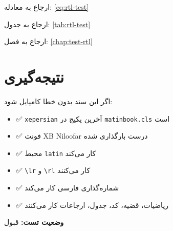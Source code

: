 \documentclass{matinbook}
\begin{document}
ارجاع به معادله: \cref{eq:rtl-test}

ارجاع به جدول: \cref{tab:rtl-test}

ارجاع به فصل: \cref{chap:test-rtl}

\section{نتیجه‌گیری}
\label{sec:conclusion}

اگر این سند بدون خطا کامپایل شود:

\begin{itemize}
    \item ✅ \texttt{xepersian} آخرین پکیج در \texttt{matinbook.cls} است
    \item ✅ فونت XB Niloofar درست بارگذاری شده
    \item ✅ محیط \texttt{latin} کار می‌کند
    \item ✅ \texttt{\textbackslash lr} و \texttt{\textbackslash rl} کار می‌کنند
    \item ✅ شماره‌گذاری فارسی کار می‌کند
    \item ✅ ریاضیات، قضیه، کد، جدول، ارجاعات کار می‌کنند
\end{itemize}

\textbf{وضعیت تست:} قبول
\end{document}
